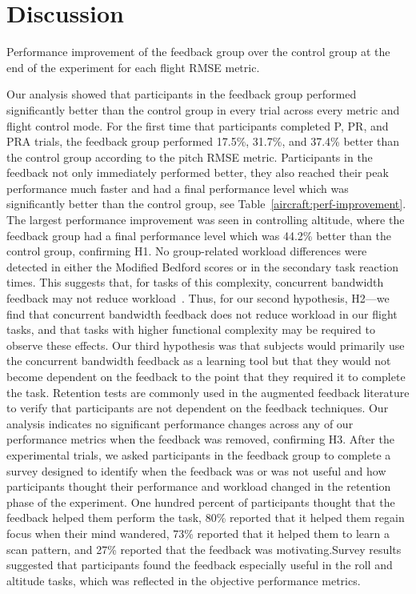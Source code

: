 \section{Discussion}

\begin{table}[b]
    \centering
    \caption[Performance improvement of the feedback group over the control group]{Performance improvement of the feedback group over the control group at the end of the experiment for each flight RMSE metric.}
    \label{aircraft:perf-improvement}
\end{table}

Our analysis showed that participants in the feedback group performed significantly better than the control group in every trial across every metric and flight control mode.
For the first time that participants completed P, PR, and PRA trials, the feedback group performed 17.5\%, 31.7\%, and 37.4\% better than the control group according to the pitch RMSE metric.
Participants in the feedback not only immediately performed better, they also reached their peak performance much faster and had a final performance level which was significantly better than the control group, see Table~\ref{aircraft:perf-improvement}.
The largest performance improvement was seen in controlling altitude, where the feedback group had a final performance level which was 44.2\% better than the control group, confirming H1.
No group-related workload differences were detected in either the Modified Bedford scores or in the secondary task reaction times.
This suggests that, for tasks of this complexity, concurrent bandwidth feedback may not reduce workload~\citep{karasinski_evaluating_2019}.
Thus, for our second hypothesis, H2---we find that concurrent bandwidth feedback does not reduce workload in our flight tasks, and that tasks with higher functional complexity may be required to observe these effects.
Our third hypothesis was that subjects would primarily use the concurrent bandwidth feedback as a learning tool but that they would not become dependent on the feedback to the point that they required it to complete the task.
Retention tests are commonly used in the augmented feedback literature to verify that participants are not dependent on the feedback techniques.
Our analysis indicates no significant performance changes across any of our performance metrics when the feedback was removed, confirming H3.
After the experimental trials, we asked participants in the feedback group to complete a survey designed to identify when the feedback was or was not useful and how participants thought their performance and workload changed in the retention phase of the experiment.
One hundred percent of participants thought that the feedback helped them perform the task, 80\% reported that it helped them regain focus when their mind wandered, 73\% reported that it helped them to learn a scan pattern, and 27\% reported that the feedback was motivating.Survey results suggested that participants found the feedback especially useful in the roll and altitude tasks, which was reflected in the objective performance metrics.

